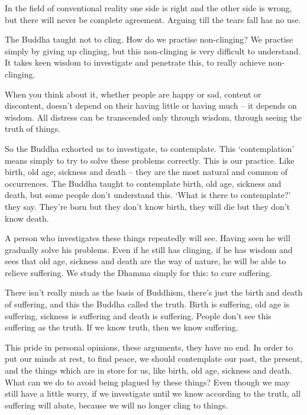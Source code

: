 In the field of conventional reality one side is right and the other side is wrong, but there will never be complete agreement. Arguing till the tears fall has no use. 

The Buddha taught not to cling. How do we practise non-clinging? We practise simply by giving up clinging, but this non-clinging is very difficult to understand. It takes keen wisdom to investigate and penetrate this, to really achieve non-clinging. 

When you think about it, whether people are happy or sad, content or discontent, doesn't depend on their having little or having much -- it depends on wisdom. All distress can be transcended only through wisdom, through seeing the truth of things. 

So the Buddha exhorted us to investigate, to contemplate. This `contemplation' means simply to try to solve these problems correctly. This is our practice. Like birth, old age, sickness and death -- they are the most natural and common of occurrences. The Buddha taught to contemplate birth, old age, sickness and death, but some people don't understand this. `What is there to contemplate?' they say. They're born but they don't know birth, they will die but they don't know death. 

A person who investigates these things repeatedly will see. Having seen he will gradually solve his problems. Even if he still has clinging, if he has wisdom and sees that old age, sickness and death are the way of nature, he will be able to relieve suffering. We study the Dhamma simply for this: to cure suffering. 

There isn't really much as the basis of Buddhism, there's just the birth and death of suffering, and this the Buddha called the truth. Birth is suffering, old age is suffering, sickness is suffering and death is suffering. People don't see this suffering as the truth. If we know truth, then we know suffering. 

This pride in personal opinions, these arguments, they have no end. In order to put our minds at rest, to find peace, we should contemplate our past, the present, and the things which are in store for us, like birth, old age, sickness and death. What can we do to avoid being plagued by these things? Even though we may still have a little worry, if we investigate until we know according to the truth, all suffering will abate, because we will no longer cling to things. 

